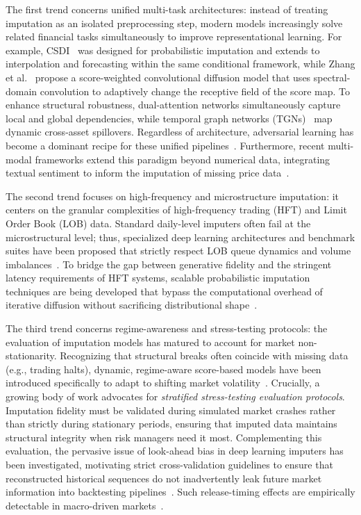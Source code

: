 The first trend concerns unified multi-task architectures: instead of treating imputation as an isolated preprocessing step, modern models increasingly solve related financial tasks simultaneously to improve representational learning. For example, CSDI~\citep{tashiro2021csdi} was designed for probabilistic imputation and extends to interpolation and forecasting within the same conditional framework, while Zhang et al.~\citep{Score-CDM} propose a score-weighted convolutional diffusion model that uses spectral-domain convolution to adaptively change the receptive field of the score map. To enhance structural robustness, dual-attention networks simultaneously capture local and global dependencies, while temporal graph networks (TGNs)~\citep{rossi2020temporal} map dynamic cross-asset spillovers. Regardless of architecture, adversarial learning has become a dominant recipe for these unified pipelines~\citep{richter2024survey}. Furthermore, recent multi-modal frameworks extend this paradigm beyond numerical data, integrating textual sentiment to inform the imputation of missing price data~\citep{T2S}.

The second trend focuses on high-frequency and microstructure imputation: it centers on the granular complexities of high-frequency trading (HFT) and Limit Order Book (LOB) data. Standard daily-level imputers often fail at the microstructural level; thus, specialized deep learning architectures and benchmark suites have been proposed that strictly respect LOB queue dynamics and volume imbalances~\citep{lobench2025}. To bridge the gap between generative fidelity and the stringent latency requirements of HFT systems, scalable probabilistic imputation techniques are being developed that bypass the computational overhead of iterative diffusion without sacrificing distributional shape~\citep{richter2024survey}.

The third trend concerns regime-awareness and stress-testing protocols: the evaluation of imputation models has matured to account for market non-stationarity. Recognizing that structural breaks often coincide with missing data (e.g., trading halts), dynamic, regime-aware score-based models have been introduced specifically to adapt to shifting market volatility~\citep{wang2024mtsisurvey}. Crucially, a growing body of work advocates for \textit{stratified stress-testing evaluation protocols}. Imputation fidelity must be validated during simulated market crashes rather than strictly during stationary periods, ensuring that imputed data maintains structural integrity when risk managers need it most. Complementing this evaluation, the pervasive issue of look-ahead bias in deep learning imputers has been investigated, motivating strict cross-validation guidelines to ensure that reconstructed historical sequences do not inadvertently leak future market information into backtesting pipelines~\citep{wang2024mtsisurvey}. Such release-timing effects are empirically detectable in macro-driven markets~\citep{frino2018macroeconomic}.

